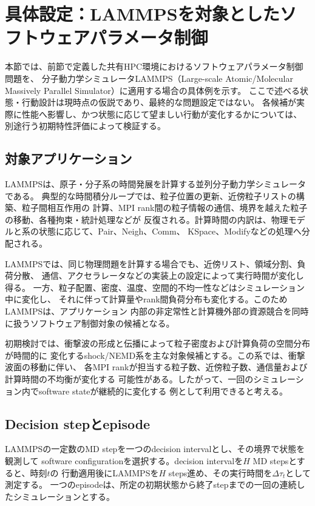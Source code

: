 \section{具体設定：LAMMPSを対象としたソフトウェアパラメータ制御}
\label{sec:lammps-setting}

本節では、前節で定義した共有HPC環境におけるソフトウェアパラメータ制御問題を、
分子動力学シミュレータLAMMPS（Large-scale Atomic/Molecular Massively Parallel
Simulator）に適用する場合の具体例を示す。
ここで述べる状態・行動設計は現時点の仮説であり、最終的な問題設定ではない。
各候補が実際に性能へ影響し、かつ状態に応じて望ましい行動が変化するかについては、
別途行う初期特性評価によって検証する。

\subsection{対象アプリケーション}

LAMMPSは、原子・分子系の時間発展を計算する並列分子動力学シミュレータである。
典型的な時間積分ループでは、粒子位置の更新、近傍粒子リストの構築、粒子間相互作用の
計算、MPI rank間の粒子情報の通信、境界を越えた粒子の移動、各種拘束・統計処理などが
反復される。計算時間の内訳は、物理モデルと系の状態に応じて、Pair、Neigh、Comm、
KSpace、Modifyなどの処理へ分配される。

LAMMPSでは、同じ物理問題を計算する場合でも、近傍リスト、領域分割、負荷分散、
通信、アクセラレータなどの実装上の設定によって実行時間が変化し得る。
一方、粒子配置、密度、温度、空間的不均一性などはシミュレーション中に変化し、
それに伴って計算量やrank間負荷分布も変化する。このためLAMMPSは、アプリケーション
内部の非定常性と計算機外部の資源競合を同時に扱うソフトウェア制御対象の候補となる。

初期検討では、衝撃波の形成と伝播によって粒子密度および計算負荷の空間分布が時間的に
変化するshock/NEMD系を主な対象候補とする。この系では、衝撃波面の移動に伴い、
各MPI rankが担当する粒子数、近傍粒子数、通信量および計算時間の不均衡が変化する
可能性がある。したがって、一回のシミュレーション内でsoftware stateが継続的に変化する
例として利用できると考える。

\subsection{Decision stepとepisode}

LAMMPSの一定数のMD stepを一つのdecision intervalとし、その境界で状態を観測して
software configurationを選択する。decision intervalを$H$ MD stepsとすると、時刻$t$の
行動適用後にLAMMPSを$H$ steps進め、その実行時間を$\Delta\tau_t$として測定する。
一つのepisodeは、所定の初期状態から終了stepまでの一回の連続したシミュレーションとする。

